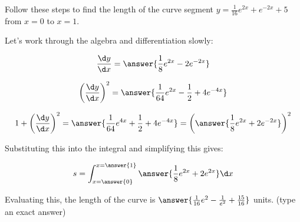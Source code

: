 \documentclass{ximera}
\author{Jim Talamo}
\begin{document}
\begin{exercise}

Follow these steps to find the length of the curve segment $y=\frac{1}{16}e^{2x}+e^{-2x}+5$ from $x=0$ to $x=1$.

Let's work through the algebra and differentiation slowly:

\[
\frac{\d y}{\d x} = \answer{\frac{1}{8}e^{2x}-2e^{-2x}}
\]
\begin{exercise}
\[
\left(\frac{\d y}{\d x}\right)^2 = \answer{\frac{1}{64}e^{2x}-\frac{1}{2}+4e^{-4x}}
\]

\begin{exercise}

\[
1+ \left(\frac{\d y}{\d x}\right)^2 = \answer{\frac{1}{64}e^{4x}+\frac{1}{2}+4e^{-4x}} = \left(\answer{\frac{1}{8}e^{2x}+2e^{-2x} }  \right)^2
\]

\begin{exercise}
Substituting this into the integral and simplifying this gives:

\[
s= \int_{x=\answer{0}}^{x=\answer{1}} \answer{\frac{1}{8}e^{2x}+2e^{2x}} \d x 
\]

Evaluating this, the length of the curve is $\answer{\frac{1}{16}e^2-\frac{1}{e^2} +\frac{15}{16} }$ units. (type an exact answer)


\end{exercise}
\end{exercise}
\end{exercise}



\end{exercise}
\end{document}
